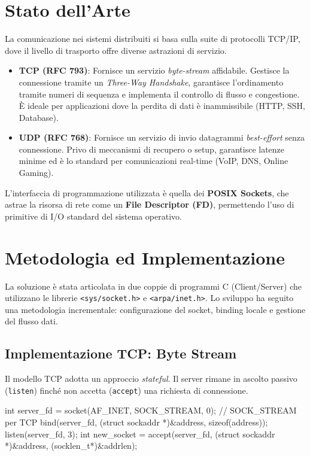 \documentclass[a4paper,12pt]{article}
\begin{document}
\section{Stato dell'Arte}
La comunicazione nei sistemi distribuiti si basa sulla suite di protocolli TCP/IP, dove il livello di trasporto offre diverse astrazioni di servizio.
\begin{itemize}
    \item \textbf{TCP (RFC 793)}: Fornisce un servizio \textit{byte-stream} affidabile. Gestisce la connessione tramite un \textit{Three-Way Handshake}, garantisce l'ordinamento tramite numeri di sequenza e implementa il controllo di flusso e congestione. È ideale per applicazioni dove la perdita di dati è inammissibile (HTTP, SSH, Database).
    \item \textbf{UDP (RFC 768)}: Fornisce un servizio di invio datagrammi \textit{best-effort} senza connessione. Privo di meccanismi di recupero o setup, garantisce latenze minime ed è lo standard per comunicazioni real-time (VoIP, DNS, Online Gaming).
\end{itemize}
L'interfaccia di programmazione utilizzata è quella dei \textbf{POSIX Sockets}, che astrae la risorsa di rete come un \textbf{File Descriptor (FD)}, permettendo l'uso di primitive di I/O standard del sistema operativo.

\section{Metodologia ed Implementazione}
La soluzione è stata articolata in due coppie di programmi C (Client/Server) che utilizzano le librerie \texttt{<sys/socket.h>} e \texttt{<arpa/inet.h>}. Lo sviluppo ha seguito una metodologia incrementale: configurazione del socket, binding locale e gestione del flusso dati.

\subsection{Implementazione TCP: Byte Stream}
Il modello TCP adotta un approccio \textit{stateful}. Il server rimane in ascolto passivo (\texttt{listen}) finché non accetta (\texttt{accept}) una richiesta di connessione.
\begin{ccode}
int server_fd = socket(AF_INET, SOCK_STREAM, 0); // SOCK_STREAM per TCP
bind(server_fd, (struct sockaddr *)&address, sizeof(address));
listen(server_fd, 3);
int new_socket = accept(server_fd, (struct sockaddr *)&address, (socklen_t*)&addrlen);
\end{ccode}
\end{document}

